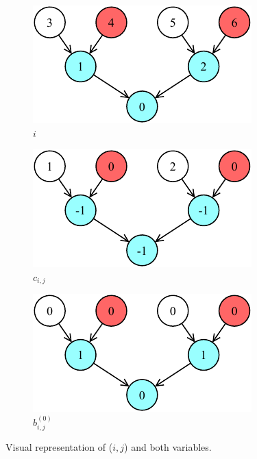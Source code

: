 \documentclass[letterpaper,10pt]{article}
\begin{document}
\begin{figure}[hbtp]
    \centering
    \begin{subfigure}[b]{0.30\textwidth}
        \includegraphics[width=\textwidth]{i.pdf}
        \caption{$i$}
        \label{subfig:i}
    \end{subfigure}
    \hspace{0.01\textwidth}
    \begin{subfigure}[b]{0.30\textwidth}
        \includegraphics[width=\textwidth]{ci.pdf}
        \caption{$c_{i,j}$}
        \label{subfig:ci}
    \end{subfigure}
    \hspace{0.01\textwidth}
    \begin{subfigure}[b]{0.30\textwidth}
        \includegraphics[width=\textwidth]{bit.pdf}
        \caption{$b_{i,j}^{(0)}$}
        \label{subfig:bit}
    \end{subfigure}
    \caption{Visual representation of ($i,j$) and both variables.}
    \label{fig:variables}
\end{figure}
\end{document}
